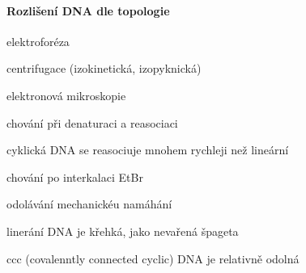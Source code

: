 \documentclass[DIV=8]{scrreprt}
\begin{document}
\paragraph{Rozlišení DNA dle topologie}
\begin{myItemize}[nosep]
    \item elektroforéza
    \item centrifugace (izokinetická, izopyknická)
    \item elektronová mikroskopie
    \item chování při denaturaci a reasociaci
\begin{myItemize}[nosep]
    \item cyklická DNA se reasociuje mnohem rychleji než lineární
\end{myItemize}

    \item chování po interkalaci EtBr
    \item odolávání mechanickéu namáhání
\begin{myItemize}[nosep]
    \item linerání DNA je křehká, jako nevařená špageta
    \item ccc (covalenntly connected cyclic) DNA je relativně odolná
\end{myItemize}

\end{myItemize}
\end{document}
